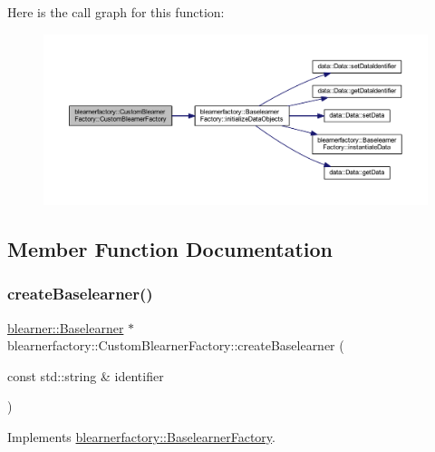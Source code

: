 Here is the call graph for this function\+:\nopagebreak
\begin{figure}[H]
\begin{center}
\leavevmode
\includegraphics[width=350pt]{classblearnerfactory_1_1_custom_blearner_factory_a1a006cb772dc79cbcbcab810f5431b2c_cgraph}
\end{center}
\end{figure}


\subsection{Member Function Documentation}
\mbox{\label{classblearnerfactory_1_1_custom_blearner_factory_aad915d1ac58a323d1584d27f8cdace56}} 
\subsubsection{\texorpdfstring{create\+Baselearner()}{createBaselearner()}}
{\footnotesize\ttfamily \hyperlink{classblearner_1_1_baselearner}{blearner\+::\+Baselearner} $\ast$ blearnerfactory\+::\+Custom\+Blearner\+Factory\+::create\+Baselearner (\begin{DoxyParamCaption}\item[{const std\+::string \&}]{identifier }\end{DoxyParamCaption})\hspace{0.3cm}{\ttfamily [virtual]}}



Implements \hyperlink{classblearnerfactory_1_1_baselearner_factory_ac3584a20a84834099a15908690b837bb}{blearnerfactory\+::\+Baselearner\+Factory}.

